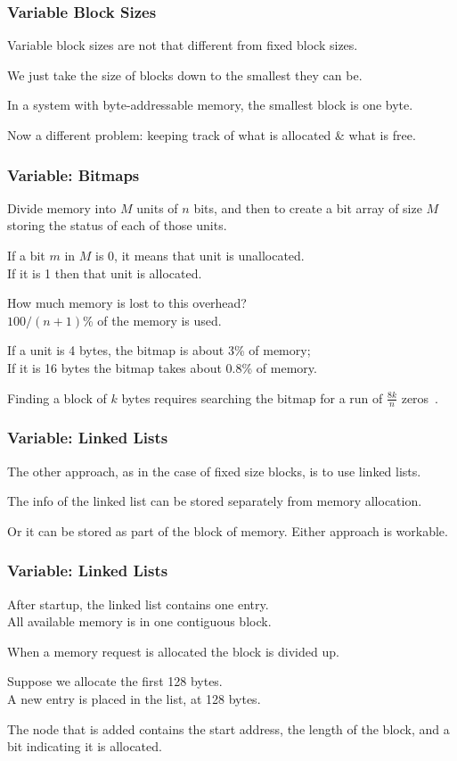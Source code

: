 \begin{frame}
\frametitle{Variable Block Sizes}

Variable block sizes are not that different from fixed block sizes.

We just take the size of blocks down to the smallest they can be. 

In a system with byte-addressable memory, the smallest block is one byte.

Now a different problem: keeping track of what is allocated \& what is free.


\end{frame}

\begin{frame}
\frametitle{Variable: Bitmaps}

Divide memory into $M$ units of $n$ bits, and then to create a bit array of size $M$ storing the status of each of those units. 

If a bit $m$ in $M$ is 0, it means that unit is unallocated.\\
If it is 1 then that unit is allocated. 

How much memory is lost to this overhead?\\
\quad $100/(n+1)$\% of the memory is used. 

If a unit is 4 bytes, the bitmap is about 3\% of memory; \\
If it is 16 bytes the bitmap takes about 0.8\% of memory. 

Finding a block of $k$ bytes requires searching the bitmap for a run of $\frac{8k}{n}$ zeros~.

\end{frame}

\begin{frame}
\frametitle{Variable: Linked Lists}

The other approach, as in the case of fixed size blocks, is to use linked lists. 

The info of the linked list can be stored separately from memory allocation.

Or it can be stored as part of the block of memory. Either approach is workable.

\end{frame}

\begin{frame}
\frametitle{Variable: Linked Lists}

After startup, the linked list contains one entry.\\
\quad  All available memory is in one contiguous block. 

When a memory request is allocated the block is divided up. 

Suppose we allocate the first 128 bytes.\\
\quad A new entry is placed in the list, at 128 bytes. 

The node that is added contains the start address, the length of the block, and a bit indicating it is allocated. 

\end{frame}

